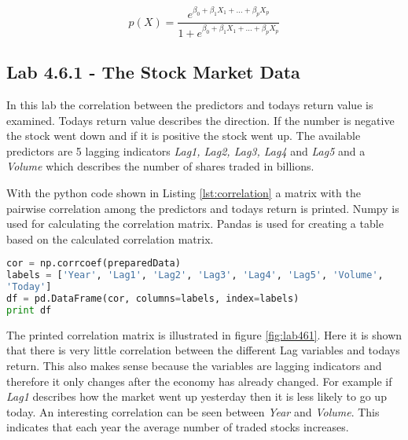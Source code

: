 
\begin{equation}
	p(X) = \dfrac{e^{\beta_0 + \beta_1 X_1 + ... + \beta_p X_p}}{1 + e^{\beta_0 + \beta_1 X_1 + ... + \beta_p X_p}}
\end{equation}


\subsection{Lab 4.6.1 - The Stock Market Data}
In this lab the correlation between the predictors and todays return value is examined. Todays return value describes the direction. If the number is negative the stock went down and if it is positive the stock went up. The available predictors are 5 lagging indicators \emph{Lag1, Lag2, Lag3, Lag4} and \emph{Lag5} and a \emph{Volume} which describes the number of shares traded in billions.

With the python code shown in Listing \ref{lst:correlation} a matrix with the pairwise correlation among the predictors and todays return is printed. Numpy is used for calculating the correlation matrix. Pandas is used for creating a table based on the calculated correlation matrix.

\begin{lstlisting}[language=Python, label=lst:correlation, caption=Printing correlation matrix]
cor = np.corrcoef(preparedData)
labels = ['Year', 'Lag1', 'Lag2', 'Lag3', 'Lag4', 'Lag5', 'Volume', 
'Today']
df = pd.DataFrame(cor, columns=labels, index=labels)
print df
\end{lstlisting}

The printed correlation matrix is illustrated in figure \ref{fig:lab461}. Here it is shown that there is very little correlation between the different Lag variables and todays return. This also makes sense because the variables are lagging indicators and therefore it only changes after the economy has already changed. For example if \emph{Lag1} describes how the market went up yesterday then it is less likely to go up today. An interesting correlation can be seen between \emph{Year} and \emph{Volume}. This indicates that each year the average number of traded stocks increases. 


